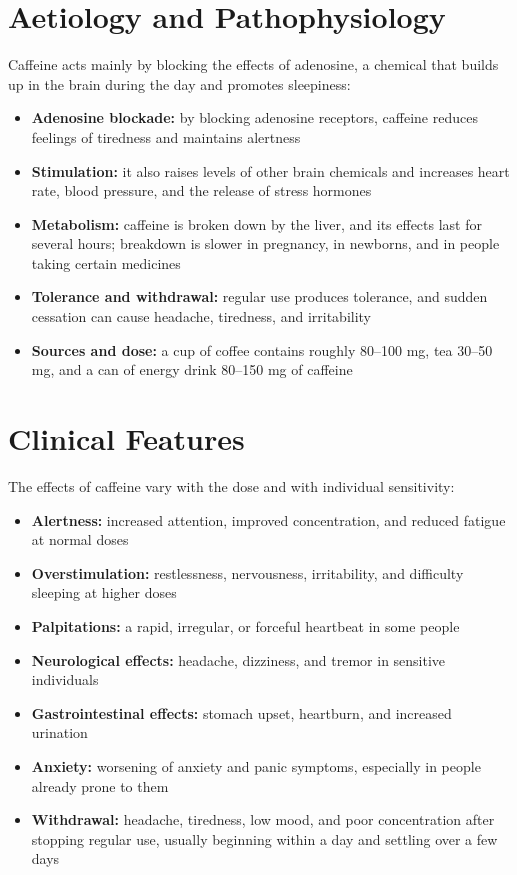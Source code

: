 \section*{Aetiology and Pathophysiology}
Caffeine acts mainly by blocking the effects of adenosine, a chemical that builds up in the brain during the day and promotes sleepiness:
\begin{itemize}
    \item \textbf{Adenosine blockade:} by blocking adenosine receptors, caffeine reduces feelings of tiredness and maintains alertness
    \item \textbf{Stimulation:} it also raises levels of other brain chemicals and increases heart rate, blood pressure, and the release of stress hormones
    \item \textbf{Metabolism:} caffeine is broken down by the liver, and its effects last for several hours; breakdown is slower in pregnancy, in newborns, and in people taking certain medicines
    \item \textbf{Tolerance and withdrawal:} regular use produces tolerance, and sudden cessation can cause headache, tiredness, and irritability
    \item \textbf{Sources and dose:} a cup of coffee contains roughly 80--100 mg, tea 30--50 mg, and a can of energy drink 80--150 mg of caffeine
\end{itemize}

\section*{Clinical Features}
The effects of caffeine vary with the dose and with individual sensitivity:
\begin{itemize}
    \item \textbf{Alertness:} increased attention, improved concentration, and reduced fatigue at normal doses
    \item \textbf{Overstimulation:} restlessness, nervousness, irritability, and difficulty sleeping at higher doses
    \item \textbf{Palpitations:} a rapid, irregular, or forceful heartbeat in some people
    \item \textbf{Neurological effects:} headache, dizziness, and tremor in sensitive individuals
    \item \textbf{Gastrointestinal effects:} stomach upset, heartburn, and increased urination
    \item \textbf{Anxiety:} worsening of anxiety and panic symptoms, especially in people already prone to them
    \item \textbf{Withdrawal:} headache, tiredness, low mood, and poor concentration after stopping regular use, usually beginning within a day and settling over a few days
\end{itemize}

